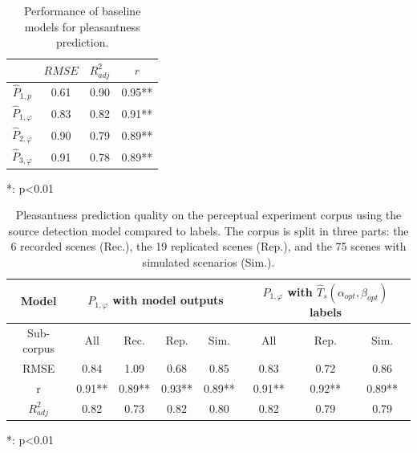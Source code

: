 \documentclass[twocolumn]{article}
\begin{document}
\begin{table}[t]
\centering
\caption{Performance of baseline models for pleasantness prediction.}
\label{tab:pleasm}
\begin{threeparttable}
\begin{tabular}{ c | c | c | c }
\hline
	 & $RMSE$ & $R^2_{adj}$ & $r$ \\ \hline
	$\hat P_{1, p}$ & 0.61 & 0.90 & 0.95** \\ \hline
	$\hat P_{1, \varphi}$ & 0.83 & 0.82 & 0.91** \\
	$\hat P_{2, \varphi}$ & 0.90 & 0.79 & 0.89** \\
	$\hat P_{3, \varphi}$ & 0.91 & 0.78 & 0.89** \\ \hline
\end{tabular}
\begin{tablenotes}
\item **: p<0.01
\end{tablenotes}
\end{threeparttable}
\end{table}

\begin{table}[t]
\centering
\caption{Pleasantness prediction quality on the perceptual experiment corpus using the source detection model compared to labels. The corpus is split in three parts: the 6 recorded scenes (Rec.), the 19 replicated scenes (Rep.), and the 75 scenes with simulated scenarios (Sim.).}
\label{tab:pppred}
\begin{threeparttable}
\begin{tabular}{ c | c c c c | c c c }
\hline
	Model & \multicolumn{4}{|c}{$P_{1, \varphi}$ with model outputs} & \multicolumn{3}{|c}{$P_{1, \varphi}$ with $\hat T_s(\alpha_{opt}, \beta_{opt})$ labels} \\ \hline
	Sub-corpus & All & Rec. & Rep. & Sim. & All & Rep. & Sim. \\ \hline
	RMSE & 0.84 & 1.09 & 0.68 & 0.85 & 0.83 & 0.72 & 0.86 \\ \hline
	r & 0.91** & 0.89** & 0.93** & 0.89** & 0.91** & 0.92** & 0.89** \\ \hline
	$R^2_{adj}$ & 0.82 & 0.73 & 0.82 & 0.80 & 0.82 & 0.79 & 0.79 \\ \hline
\end{tabular}
\begin{tablenotes}
\item **: p<0.01
\end{tablenotes}
\end{threeparttable}
\end{table}
\end{document}
